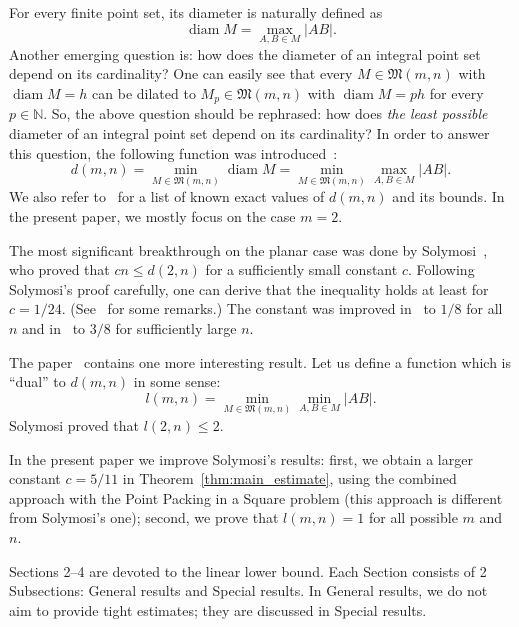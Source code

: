 \documentclass[a4paper,14pt]{article} %
\theoremstyle{plain}
\theoremstyle{definition}
\begin{document}
For every finite point set, its diameter is naturally defined as
\begin{equation}
	\operatorname{diam} M = \max_{A,B\in M} |AB|
	.
\end{equation}
Another emerging question is: how does the diameter of an integral point set depend on its cardinality?
One can easily see that every $M\in\mathfrak{M}(m,n)$ with $\operatorname{diam} M = h$
can be dilated to $M_p\in\mathfrak{M}(m,n)$ with $\operatorname{diam} M = ph$
for every $p\in\mathbb{N}$.
So, the above question should be rephrased:
how does \textit{the least possible} diameter of an integral point set depend on its cardinality?
In order to answer this question, the following function was introduced~\cite{kurz2008bounds,kurz2008minimum}:
\begin{equation}
	d(m,n) = \min_{M\in\mathfrak{M}(m,n)} \operatorname{diam} M = \min_{M\in\mathfrak{M}(m,n)} \max_{A,B\in M} |AB|
	.
\end{equation}
We also refer to~\cite{kurz2008bounds} for a list of known exact values of $d(m,n)$ and its bounds.
In the present paper, we mostly focus on the case $m=2$.

The most significant breakthrough on the planar case was done by Solymosi~\cite{solymosi2003note},
who proved that $cn \leq d(2,n)$ for a sufficiently small constant $c$.
Following Solymosi's proof carefully,
one can derive that the inequality holds at least for $c = 1/24$.
(See~\cite[Exercise 2.6]{garibaldi2005erdos} for some remarks.)
The constant was improved in~\cite{our-mz-rus-translit} to $1/8$ for all $n$ and in~\cite{our-vmmsh-2018-translit}
to $3/8$ for sufficiently large $n$.

The paper~\cite{solymosi2003note} contains one more interesting result.
Let us define a function which is ``dual'' to $d(m,n)$ in some sense:
\begin{equation}
	l(m,n) = \min_{M\in\mathfrak{M}(m,n)} \min_{A,B\in M} |AB|
	.
\end{equation}
Solymosi proved that $l(2,n)\leq 2$.

In the present paper we improve Solymosi's results:
first, we obtain a larger constant $c = 5/11$ in Theorem~\ref{thm:main_estimate},
using the combined approach with the Point Packing in a Square problem
(this approach is different from Solymosi's one);
second, we prove that $l(m,n)=1$ for all possible $m$ and $n$.

Sections 2--4 are devoted to the linear lower bound.
Each Section consists of 2 Subsections: General results and Special results.
In General results, we do not aim to provide tight estimates;
they are discussed in Special results.
\end{document}
